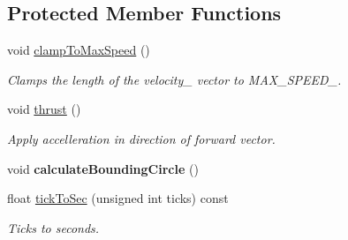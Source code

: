 \subsection*{Protected Member Functions}
\begin{DoxyCompactItemize}
\item 
\hypertarget{class_ship_a8e7bc2ee7d749ab0d28062091733987c}{}void \hyperlink{class_ship_a8e7bc2ee7d749ab0d28062091733987c}{clamp\+To\+Max\+Speed} ()\label{class_ship_a8e7bc2ee7d749ab0d28062091733987c}

\begin{DoxyCompactList}\small\item\em Clamps the length of the velocity\+\_\+ vector to M\+A\+X\+\_\+\+S\+P\+E\+E\+D\+\_\+. \end{DoxyCompactList}\item 
\hypertarget{class_ship_a4543637a3f0b4275206f684247e1b313}{}void \hyperlink{class_ship_a4543637a3f0b4275206f684247e1b313}{thrust} ()\label{class_ship_a4543637a3f0b4275206f684247e1b313}

\begin{DoxyCompactList}\small\item\em Apply accelleration in direction of forward vector. \end{DoxyCompactList}\item 
\hypertarget{class_ship_a7136b677ba0b2139b429dfa7013a8237}{}void {\bfseries calculate\+Bounding\+Circle} ()\label{class_ship_a7136b677ba0b2139b429dfa7013a8237}

\item 
\hypertarget{class_ship_ab865757829aec291f3f1d26cb598b39d}{}float \hyperlink{class_ship_ab865757829aec291f3f1d26cb598b39d}{tick\+To\+Sec} (unsigned int ticks) const \label{class_ship_ab865757829aec291f3f1d26cb598b39d}

\begin{DoxyCompactList}\small\item\em Ticks to seconds. \end{DoxyCompactList}\end{DoxyCompactItemize}
